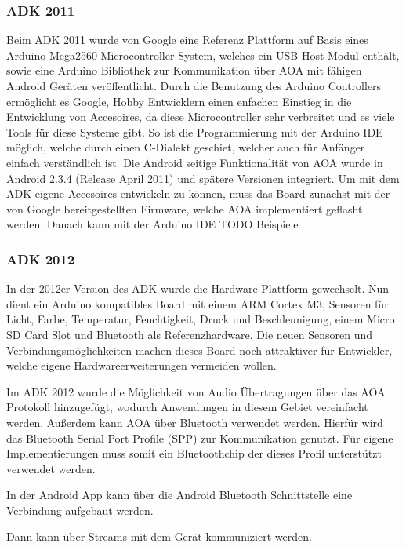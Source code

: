 \documentclass[12pt,journal,compsoc]{IEEEtran}
\begin{document}
\subsubsection{ADK 2011}
Beim ADK 2011 wurde von Google eine
Referenz Plattform auf Basis eines Arduino Mega2560 Microcontroller System, welches ein USB Host Modul enthält, sowie eine Arduino Bibliothek zur Kommunikation über AOA mit fähigen Android Geräten veröffentlicht.
Durch die Benutzung des Arduino Controllers ermöglicht es Google, Hobby Entwicklern einen enfachen Einstieg in die Entwicklung von Accesoires, da diese Microcontroller sehr verbreitet und es viele Tools für diese Systeme gibt.
So ist die Programmierung mit der Arduino IDE möglich, welche durch einen C-Dialekt geschiet, welcher auch für Anfänger einfach verständlich ist.
Die Android seitige Funktionalität von AOA wurde in Android 2.3.4 (Release April 2011) und spätere Versionen integriert. 
Um mit dem ADK eigene Accesoires entwickeln zu können, muss das Board zunächst mit der von Google bereitgestellten Firmware, welche AOA implementiert geflasht werden.
Danach kann mit der Arduino IDE 
TODO Beispiele
\subsubsection{ADK 2012}
In der 2012er Version des ADK wurde die Hardware Plattform gewechselt. Nun dient ein Arduino kompatibles Board mit einem ARM Cortex M3, Sensoren für Licht, Farbe, Temperatur, Feuchtigkeit, Druck und Beschleunigung, einem Micro SD Card Slot und Bluetooth als Referenzhardware.
Die neuen Sensoren und Verbindungsmöglichkeiten machen dieses Board noch attraktiver für Entwickler, welche eigene Hardwareerweiterungen vermeiden wollen.

Im ADK 2012 wurde die Möglichkeit von Audio Übertragungen über das AOA Protokoll hinzugefügt, wodurch Anwendungen in diesem Gebiet vereinfacht werden.
Außerdem kann AOA über Bluetooth verwendet werden. Hierfür wird das Bluetooth Serial Port Profile (SPP) zur Kommunikation genutzt. Für eigene Implementierungen muss somit ein Bluetoothchip der dieses Profil unterstützt verwendet werden.


In der Android App kann über die Android Bluetooth Schnittstelle eine Verbindung aufgebaut werden.

Dann kann über Streams mit dem Gerät kommuniziert werden.
\end{document}
